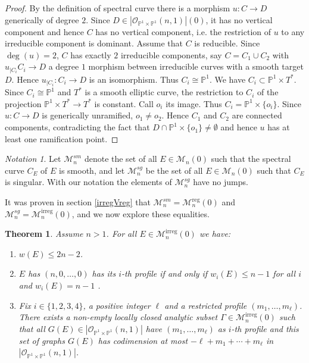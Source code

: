 \documentclass[
  a4paper, 
  reqno, 
  oneside, 
  11pt
]{amsart}
\theoremstyle{plain}	%
\newtheorem{theorem}{Theorem} %
\theoremstyle{mydef} %
\theoremstyle{remark}
\newtheorem{notation}{Notation}
\theoremstyle{definition}
\theoremstyle{remark}
\DeclareMathOperator{\reg}{reg}
\DeclareMathOperator{\irreg}{irreg}
\begin{document}
\begin{proof}
By the definition of spectral curve there is a morphism $u\colon C\to D$ generically of degree $2$. Since $D\in|\mathcal O_{\mathbb P^1\times \mathbb P^1}(n,1)|(0)$, it has no vertical component and hence $C$ has no vertical component, i.e. the restriction of $u$ to any irreducible component is dominant. Assume that $C$ is reducible. Since $\deg(u)=2$, $C$ has exactly $2$ irreducible components, say $C=C_1\cup C_2$ with $u_{|C_i} C_i\to D$ a degree $1$ morphism between irreducible curves with a smooth target $D$. 
Hence $u_{|C_i}\colon C_i\to D$ is an isomorphism. Thus $C_i\cong \mathbb P^1$. We have $C_i\subset \mathbb P^1\times T^*$. Since $C_i\cong \mathbb P^1$ and $T^*$ is a smooth elliptic curve, the restriction to $C_i$ of the projection $\mathbb P^1\times T^*\to T^*$ is constant. Call $o_i$ its image. Thus $C_i =\mathbb P^1\times \{o_i\}$. Since $u\colon C\to D$ is generically unramified, $o_1\ne o_2$. Hence $C_1$ and $C_2$ are connected components, contradicting the fact
that $D\cap \mathbb P^1\times \{o_1\}\ne \emptyset$ and hence $u$ has at least one ramification point.
\end{proof}

\begin{notation}\label{nota}
Let $\mathcal M_n^{sm}$ denote the set of all $E\in \mathcal M_n(0)$ 
such that the spectral curve $C_E$ of $E$ is smooth,
and let $\mathcal M_n^{sg}$ be the set of all $E\in \mathcal M_n(0)$ such that $C_E$ is singular. With our notation the elements of $\mathcal M_n^{sg}$ have no jumps.
\end{notation}

It was proven in section \ref{irregVreg} that  $\mathcal M_n^{sm}= \mathcal M_n^{\reg}(0)$
and $\mathcal M_n^{sg}= \mathcal M_n^{\irreg}(0)$, and we now explore these equalities. 


\begin{theorem}\label{Wrr5}
Assume $n>1$. For all $E\in \mathcal M_n^{\irreg}(0)$  we have:
\begin{enumerate}
\item $w(E)\le 2n-2$.
\item $E$ has $(n, 0,\dots, 0)$ has its $i$-th profile if and only if $w_i(E)\le n-1$ for all $i$ and $w_i(E)=n-1$ .
\item Fix $i\in \{1,2,3,4\}$, a positive integer $\ell$ and a restricted profile $(m_1,\dots ,m_\ell)$. 
There exists a non-empty locally closed analytic subset $\Gamma \in \mathcal M_n^{\irreg}(0)$
such that  all  $G(E)\in |\mathcal O_{\mathbb P^1\times \mathbb P^1}(n,1)|$ have   $(m_1,\dots ,m_\ell)$ as $i$-th profile
and this set of graphs $G(E)$  has codimension at most $-\ell +m_1+\cdots +m_\ell$ in $|\mathcal O_{\mathbb P^1\times \mathbb P^1}(n,1)|$.
\end{enumerate}
\end{theorem}
\end{document}
